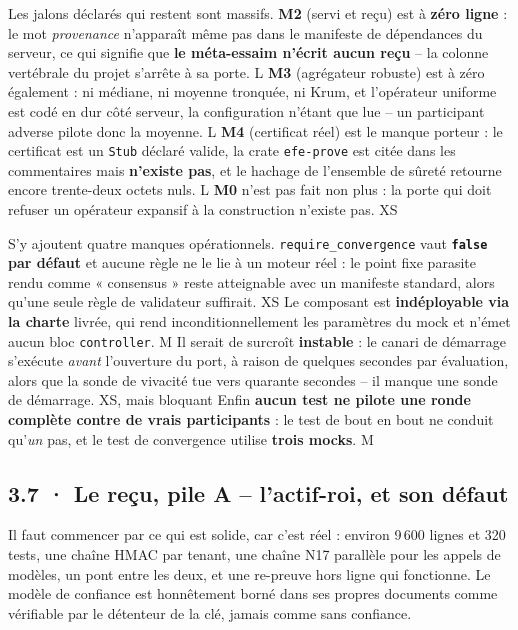\documentclass[10pt]{article}
\newcommand{\sz}[1]{{\small\color{grey}\textsf{#1}}}
\newcommand{\code}[1]{\texttt{\small #1}}
\begin{document}
Les jalons déclarés qui restent sont massifs. \textbf{M2} (servi et reçu) est à \textbf{zéro ligne} : le
mot \emph{provenance} n'apparaît même pas dans le manifeste de dépendances du serveur, ce qui signifie
que \textbf{le méta-essaim n'écrit aucun reçu} -- la colonne vertébrale du projet s'arrête à sa porte.
\sz{L} \textbf{M3} (agrégateur robuste) est à zéro également : ni médiane, ni moyenne tronquée, ni Krum,
et l'opérateur uniforme est codé en dur côté serveur, la configuration n'étant que lue -- un participant
adverse pilote donc la moyenne. \sz{L} \textbf{M4} (certificat réel) est le manque porteur : le
certificat est un \code{Stub} déclaré valide, la crate \code{efe-prove} est citée dans les commentaires
mais \textbf{n'existe pas}, et le hachage de l'ensemble de sûreté retourne encore trente-deux octets
nuls. \sz{L} \textbf{M0} n'est pas fait non plus : la porte qui doit refuser un opérateur expansif à la
construction n'existe pas. \sz{XS}

S'y ajoutent quatre manques opérationnels. \code{require\_convergence} vaut \textbf{\code{false} par
défaut} et aucune règle ne le lie à un moteur réel : le point fixe parasite rendu comme « consensus »
reste atteignable avec un manifeste standard, alors qu'une seule règle de validateur suffirait. \sz{XS}
Le composant est \textbf{indéployable via la charte} livrée, qui rend inconditionnellement les
paramètres du mock et n'émet aucun bloc \code{controller}. \sz{M} Il serait de surcroît
\textbf{instable} : le canari de démarrage s'exécute \emph{avant} l'ouverture du port, à raison de
quelques secondes par évaluation, alors que la sonde de vivacité tue vers quarante secondes -- il
manque une sonde de démarrage. \sz{XS, mais bloquant} Enfin \textbf{aucun test ne pilote une ronde
complète contre de vrais participants} : le test de bout en bout ne conduit qu'\emph{un} pas, et le test
de convergence utilise \textbf{trois mocks}. \sz{M}

\subsection{3.7 · Le reçu, pile A -- l'actif-roi, et son défaut}

Il faut commencer par ce qui est solide, car c'est réel : environ 9\,600 lignes et 320 tests, une
chaîne HMAC par tenant, une chaîne N17 parallèle pour les appels de modèles, un pont entre les deux, et
une re-preuve hors ligne qui fonctionne. Le modèle de confiance est honnêtement borné dans ses propres
documents comme vérifiable par le détenteur de la clé, jamais comme sans confiance.
\end{document}
